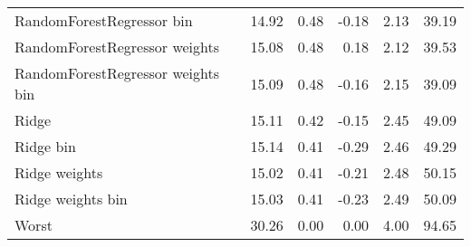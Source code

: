 \documentclass[]{article}
\begin{document}
\begin{table}
{\begin{tabular}{lrrrrr}
RandomForestRegressor bin         &     14.92 &  0.48 &  -0.18 & 2.13 &       39.19 \\
RandomForestRegressor weights     &     15.08 &  0.48 &   0.18 & 2.12 &       39.53 \\
RandomForestRegressor weights bin &     15.09 &  0.48 &  -0.16 & 2.15 &       39.09 \\
Ridge                             &     15.11 &  0.42 &  -0.15 & 2.45 &       49.09 \\
Ridge bin                         &     15.14 &  0.41 &  -0.29 & 2.46 &       49.29 \\
Ridge weights                     &     15.02 &  0.41 &  -0.21 & 2.48 &       50.15 \\
Ridge weights bin                 &     15.03 &  0.41 &  -0.23 & 2.49 &       50.09 \\
Worst                             &     30.26 &  0.00 &   0.00 & 4.00 &       94.65 \\
\bottomrule
\end{tabular}
 }
\end{table}
\end{document}
